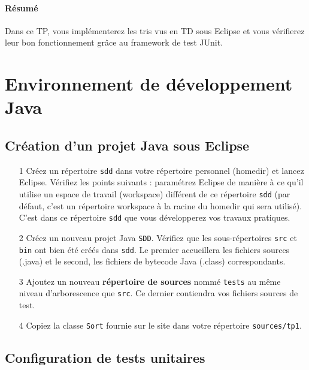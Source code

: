 \documentclass[iutinfo,a4paper,10pt]{ustl-tdtp}
\date{\annee{2018}--\annee{2019}}
\begin{document}
\maketitle
\thispagestyle{empty}

\paragraph{Résumé} Dans ce TP, vous implémenterez les tris vus en TD sous Eclipse et vous vérifierez leur bon fonctionnement grâce au framework de test JUnit.

\section{Environnement de développement Java}


\subsection{Création d'un projet Java sous Eclipse}
\begin{itemize}
\item[1] Créez un répertoire \texttt{sdd} dans votre répertoire personnel (homedir) et lancez Eclipse. Vérifiez les points suivants :
paramétrez Eclipse de manière à ce qu'il utilise un espace de travail (workspace) différent de ce répertoire \texttt{sdd} (par défaut, c'est un répertoire workspace à la racine du homedir qui sera utilisé). C'est dans ce répertoire \texttt{sdd} que vous développerez vos travaux pratiques. 
\item[2] Créez un nouveau projet Java \texttt{SDD}. Vérifiez que les sous-répertoires \texttt{src} et \texttt{bin} ont bien été créés dans \texttt{sdd}. Le premier accueillera les fichiers sources (.java) et le second, les fichiers de bytecode Java (.class) correspondants.
\item[3] Ajoutez un nouveau \textbf{répertoire de sources} nommé \texttt{tests} au même niveau d’arborescence que \texttt{src}. Ce dernier contiendra vos fichiers sources de test.
\item[4] Copiez la classe \texttt{Sort} fournie sur le site dans votre répertoire \texttt{sources/tp1}.
\end{itemize}

\subsection{Configuration de tests unitaires}
\end{document}
